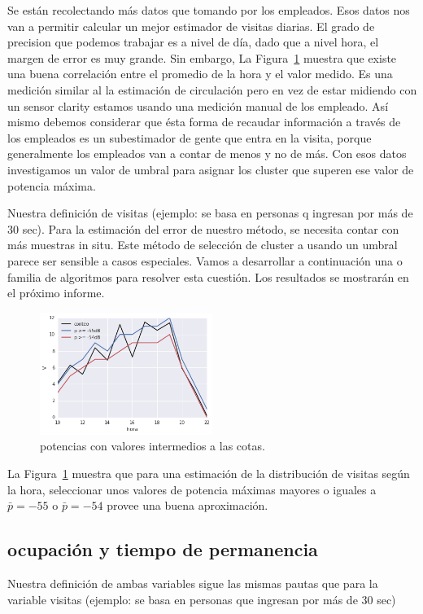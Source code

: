 Se están recolectando más datos que tomando por los empleados. Esos datos nos van a permitir calcular un mejor estimador de visitas diarias. El grado de precision que podemos trabajar es a nivel de día, dado que a nivel hora, el margen de error es muy grande.
Sin embargo, La Figura~\ref{fig:estimacion_x_hora} muestra que existe una buena correlación entre el promedio de la hora y el valor medido.
Es una medición similar al la estimación de circulación pero en vez de estar midiendo con un sensor clarity estamos usando una medición manual de los empleado. Así mismo debemos considerar que ésta forma de recaudar información a través de los empleados es un subestimador de gente que entra en la visita, porque generalmente los empleados van a contar de menos y no de más.
Con esos datos investigamos un valor de umbral para asignar los cluster que superen ese valor de potencia máxima.

Nuestra definición de visitas (ejemplo: se basa en personas q ingresan por más de 30 sec).
Para la estimación del error de nuestro método, se necesita contar con más muestras in situ.
Este método de selección de cluster a usando un umbral parece ser sensible a casos especiales. Vamos a desarrollar a continuación una o familia de algoritmos para resolver esta cuestión. Los resultados se mostrarán en el próximo informe.

\begin{figure}[H] 
  \centering
  \includegraphics[width=0.5\textwidth]{pot_para_est_x_hora.png}
  \caption{
    potencias con valores intermedios a las cotas. 
  }
  \label{fig:estimacion_x_hora}
\end{figure}

La Figura~\ref{fig:estimacion_x_hora} muestra que para una estimación de la distribución de visitas según la hora, seleccionar unos valores de potencia máximas mayores o iguales a $\bar{p} = -55$ o $\bar{p} = -54$ provee una buena aproximación.


\subsection{ocupación y tiempo de permanencia}
Nuestra definición de ambas variables
sigue las mismas pautas que para la variable visitas (ejemplo: se basa en personas que ingresan por más de 30 sec) 

